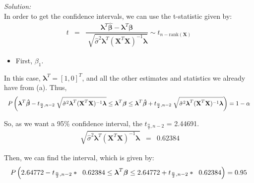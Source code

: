 \documentclass[a4paper, 11pt]{article}
\begin{document}
\noindent
\textit{Solution:}\\

In order to get the confidence intervals, we can use the t-statistic given by:
\begin{equation*}
\begin{array}{lclllll}
t & = & \dfrac{ \boldsymbol{\lambda}^T\boldsymbol{\hat{\beta}} -  \boldsymbol{\lambda}^T\boldsymbol{\beta}}{\displaystyle\sqrt[]{\hat{\sigma}^2 \boldsymbol{\lambda}^T (\textbf{X}^T \textbf{X})^{-1} \boldsymbol{\lambda}}} \sim t_{n-\mbox{rank}(\textbf{X})}
\end{array}
\end{equation*}

\begin{itemize}
\item First, $\beta_1$. 
\end{itemize}

In this case, $\boldsymbol{\lambda}^T = [1, 0]^T$, and all the other estimates and statistics we already have from (a). Thus,
\begin{equation*}
\begin{array}{lclllll}
P\left( \boldsymbol{\lambda}^T\boldsymbol{\hat{\beta}} - t_{\frac{\alpha}{2}, n-2} \hspace{0.2cm} \displaystyle\sqrt[]{\hat{\sigma}^2 \boldsymbol{\lambda}^T (\textbf{X}^T \textbf{X})^{-1} \boldsymbol{\lambda}} \leq \boldsymbol{\lambda}^T\boldsymbol{\beta} \leq \boldsymbol{\lambda}^T\boldsymbol{\hat{\beta}} + t_{\frac{\alpha}{2}, n-2} \hspace{0.2cm} \displaystyle\sqrt[]{\hat{\sigma}^2 \boldsymbol{\lambda}^T (\textbf{X}^T \textbf{X})^{-1} \boldsymbol{\lambda}} \right) = 1 - \alpha
\end{array}
\end{equation*}

So, as we want a 95\% confidence interval, the $ t_{\frac{\alpha}{2}, n-2}$ = 2.44691.
\begin{equation*}
\begin{array}{lclllll}
\displaystyle\sqrt[]{\hat{\sigma}^2 \boldsymbol{\lambda}^T (\textbf{X}^T \textbf{X})^{-1} \boldsymbol{\lambda}} & = & 0.62384
\end{array}
\end{equation*}

Then, we can find the interval, which is given by:
\begin{equation*}
\begin{array}{lclllll}
P\left( 2.64772 - t_{\frac{\alpha}{2}, n-2} * \hspace{0.2cm} 0.62384 \leq \boldsymbol{\lambda}^T\boldsymbol{\beta} \leq 2.64772 + t_{\frac{\alpha}{2}, n-2} * \hspace{0.2cm} 0.62384 \right) = 0.95 \\ \\
\end{array}
\end{equation*}
\end{document}
